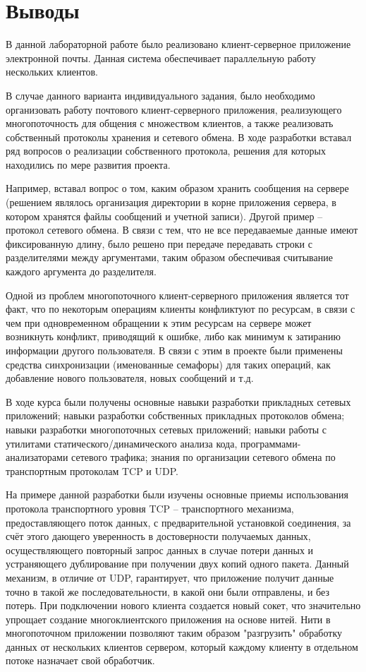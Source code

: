\section{Выводы}
В данной лабораторной работе было реализовано клиент-серверное приложение электронной почты. Данная система обеспечивает параллельную работу нескольких клиентов.

В случае данного варианта индивидуального задания, было необходимо организовать работу почтового клиент-серверного приложения, реализующего многопоточность для общения с множеством клиентов, а также реализовать собственный протоколы хранения и сетевого обмена. В ходе разработки вставал ряд вопросов о реализации собственного протокола, решения для которых находились по мере развития проекта. 

Например, вставал вопрос о том, каким образом хранить сообщения на сервере (решением являлось организация директории в корне приложения сервера, в котором хранятся файлы сообщений и учетной записи). Другой пример – протокол сетевого обмена. В связи с тем, что не все передаваемые данные имеют фиксированную длину, было решено при передаче передавать строки с разделителями между аргументами, таким образом обеспечивая считывание каждого аргумента до разделителя.

Одной из проблем многопоточного клиент-серверного приложения является тот факт, что по некоторым операциям клиенты конфликтуют по ресурсам, в связи с чем при одновременном обращении к этим ресурсам на сервере может возникнуть конфликт, приводящий к ошибке, либо как минимум к затиранию информации другого пользователя. В связи с этим в проекте были применены средства синхронизации (именованные семафоры) для таких операций, как добавление нового пользователя, новых сообщений и т.д.

В ходе курса были получены основные навыки разработки прикладных сетевых приложений; навыки разработки собственных прикладных протоколов обмена; навыки разработки многопоточных сетевых приложений; навыки работы с утилитами статического/динамического анализа кода, программами-анализаторами сетевого трафика; знания по организации сетевого обмена по транспортным протоколам TCP и UDP. 

На примере данной разработки были изучены основные приемы использования протокола транспортного уровня TCP – транспортного механизма, предоставляющего поток данных, с предварительной установкой соединения, за счёт этого дающего уверенность в достоверности получаемых данных, осуществляющего повторный запрос данных в случае потери данных и устраняющего дублирование при получении двух копий одного пакета. Данный механизм, в отличие от UDP, гарантирует, что приложение получит данные точно в такой же последовательности, в какой они были отправлены, и без потерь. При подключении нового клиента создается новый сокет, что значительно упрощает создание многоклиентского приложения на основе нитей. Нити в многопоточном приложении позволяют таким образом  "разгрузить"  обработку данных от нескольких клиентов сервером, который каждому клиенту в отдельном потоке назначает свой обработчик.

